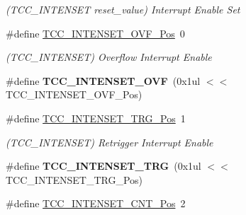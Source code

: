 \begin{DoxyCompactItemize}
\begin{DoxyCompactList}\small\item\em (T\+C\+C\+\_\+\+I\+N\+T\+E\+N\+S\+E\+T reset\+\_\+value) Interrupt Enable Set \end{DoxyCompactList}\item 
\hypertarget{group___s_a_m_l21___t_c_c_gaae07116238f04564a84ea2de3b5d9973}{}\#define \hyperlink{group___s_a_m_l21___t_c_c_gaae07116238f04564a84ea2de3b5d9973}{T\+C\+C\+\_\+\+I\+N\+T\+E\+N\+S\+E\+T\+\_\+\+O\+V\+F\+\_\+\+Pos}~0\label{group___s_a_m_l21___t_c_c_gaae07116238f04564a84ea2de3b5d9973}

\begin{DoxyCompactList}\small\item\em (T\+C\+C\+\_\+\+I\+N\+T\+E\+N\+S\+E\+T) Overflow Interrupt Enable \end{DoxyCompactList}\item 
\hypertarget{group___s_a_m_l21___t_c_c_ga2cde746b8cba4e369d6c1d1c402d92ce}{}\#define {\bfseries T\+C\+C\+\_\+\+I\+N\+T\+E\+N\+S\+E\+T\+\_\+\+O\+V\+F}~(0x1ul $<$$<$ T\+C\+C\+\_\+\+I\+N\+T\+E\+N\+S\+E\+T\+\_\+\+O\+V\+F\+\_\+\+Pos)\label{group___s_a_m_l21___t_c_c_ga2cde746b8cba4e369d6c1d1c402d92ce}

\item 
\hypertarget{group___s_a_m_l21___t_c_c_ga3ae8fa3882198d4b5e63f12495b0e7ea}{}\#define \hyperlink{group___s_a_m_l21___t_c_c_ga3ae8fa3882198d4b5e63f12495b0e7ea}{T\+C\+C\+\_\+\+I\+N\+T\+E\+N\+S\+E\+T\+\_\+\+T\+R\+G\+\_\+\+Pos}~1\label{group___s_a_m_l21___t_c_c_ga3ae8fa3882198d4b5e63f12495b0e7ea}

\begin{DoxyCompactList}\small\item\em (T\+C\+C\+\_\+\+I\+N\+T\+E\+N\+S\+E\+T) Retrigger Interrupt Enable \end{DoxyCompactList}\item 
\hypertarget{group___s_a_m_l21___t_c_c_gab69b98e04ce0536dde72b9444f665d5a}{}\#define {\bfseries T\+C\+C\+\_\+\+I\+N\+T\+E\+N\+S\+E\+T\+\_\+\+T\+R\+G}~(0x1ul $<$$<$ T\+C\+C\+\_\+\+I\+N\+T\+E\+N\+S\+E\+T\+\_\+\+T\+R\+G\+\_\+\+Pos)\label{group___s_a_m_l21___t_c_c_gab69b98e04ce0536dde72b9444f665d5a}

\item 
\hypertarget{group___s_a_m_l21___t_c_c_gaf65b3262179f2163e9a34dfea0b7e236}{}\#define \hyperlink{group___s_a_m_l21___t_c_c_gaf65b3262179f2163e9a34dfea0b7e236}{T\+C\+C\+\_\+\+I\+N\+T\+E\+N\+S\+E\+T\+\_\+\+C\+N\+T\+\_\+\+Pos}~2\label{group___s_a_m_l21___t_c_c_gaf65b3262179f2163e9a34dfea0b7e236}


\end{DoxyCompactItemize}
